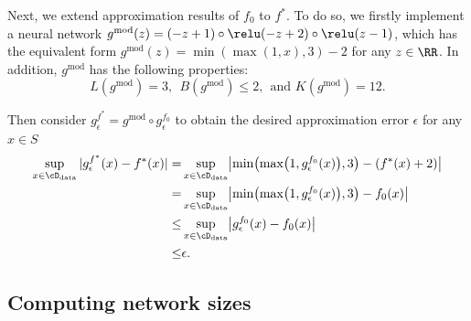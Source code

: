 Next, we extend approximation results of $f_0$ to $f^*$. To do so, we firstly implement a neural network  $g^{\text{mod}}(z)=(-z+1)\circ\relu(-z+2)\circ \relu(z-1)$, which has the equivalent form $g^{\text{mod}}(z)=\min(\max(1,x),3)-2$ for any $z\in \RR$. In addition, $g^{\text{mod}}$ has the following properties:
\begin{equation*}
    L(g^{\text{mod}}) = 3,~~B(g^{\text{mod}}) \leq 2,~~\text{and  }K(g^{\text{mod}}) = 12.
\end{equation*}

Then consider $g^{f^*}_\epsilon = g^{\text{mod}}\circ g^{f_0}_\epsilon$ to obtain the desired approximation error $\epsilon$ for any $x\in S$ 
\begin{align*}
    \sup_{x \in \cD_{\rm data}} |g^{f^*}_\epsilon(x) - f^*(x)| 
    =& \sup_{x \in \cD_{\rm data}} \bigl|\min\bigl(\max\bigl(1,g^{f_0}_\epsilon(x) \bigr),3\bigr) - (f^*(x) + 2)\bigr|\\
    =& \sup_{x \in \cD_{\rm data}} \bigl|\min\bigl(\max\bigl(1,g^{f_0}_\epsilon(x) \bigr),3\bigr) - f_0(x) \bigr|\\
    \leq& \sup_{x \in \cD_{\rm data}} \bigl| g^{f_0}_\epsilon(x)  - f_0(x) \bigr|\\
    \leq& \epsilon.
\end{align*}





\subsection{Computing network sizes}\label{sec:parameter}

